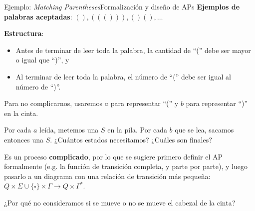 \documentclass[spanish, handout]{beamer}
\begin{document}
\begin{frame}{Ejemplo: \textit{Matching Parentheses}}{Formalización y diseño de APs}
    \textbf{Ejemplos de palabras aceptadas}: $(), ((())), ()(), \dots$ \pause

    \textbf{Estructura}:
    \begin{itemize}
        \item Antes de terminar de leer toda la palabra, la cantidad de ``('' debe ser mayor o igual que ``)'', y \pause
        \item Al terminar de leer toda la palabra, el número de ``('' debe ser igual al número de ``)''. \pause
    \end{itemize}

    Para no complicarnos, usaremos $a$ para representar ``('' y $b$ para representar ``)'' en la cinta. \pause

    \bigskip
    
    Por cada $a$ leída, metemos una $S$ en la pila. \pause
    Por cada $b$ que se lea, sacamos entonces una $S$.  \pause
    ¿Cuántos estados necesitamos? ¿Cuáles son finales? \pause

    Es un proceso \textbf{complicado}, por lo que se sugiere primero definir el AP formalmente (e.g. la función de transición completa, y parte por parte), y luego pasarlo a un diagrama con una relación de transición más pequeña: $Q \times \Sigma \cup \{\square\} \times \Gamma  \to Q \times \Gamma^*$.
    
    ¿Por qué no consideramos si se mueve o no se mueve el cabezal de la cinta?
\end{frame}
\end{document}
